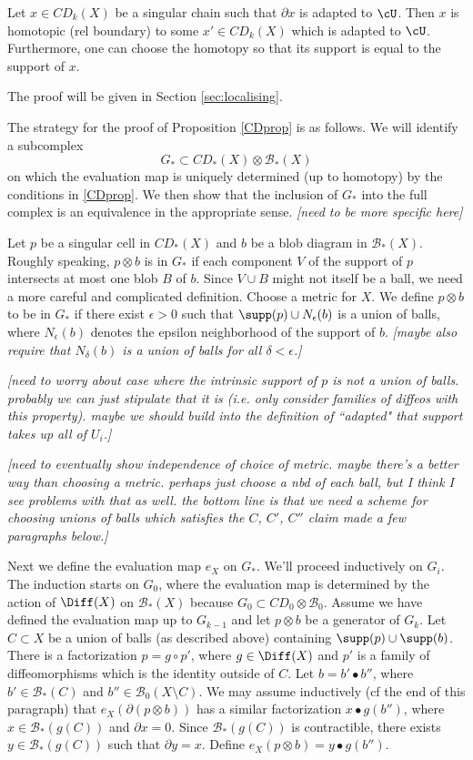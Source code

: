 \documentclass[11pt,leqno]{amsart}
\def\bc{{\mathcal B}}
\def\bd{\partial}
\def\sub{\subset}
\def\setmin{\setminus}
\def\nn#1{{{\it \small [#1]}}}
\begin{document}
\begin{lemma}  \label{extension_lemma}
Let $x \in CD_k(X)$ be a singular chain such that $\bd x$ is adapted to $\cU$.
Then $x$ is homotopic (rel boundary) to some $x' \in CD_k(X)$ which is adapted to $\cU$.
Furthermore, one can choose the homotopy so that its support is equal to the support of $x$.
\end{lemma}

The proof will be given in Section \ref{sec:localising}.

\medskip

The strategy for the proof of Proposition \ref{CDprop} is as follows.
We will identify a subcomplex
\[
    G_* \sub CD_*(X) \otimes \bc_*(X)
\]
on which the evaluation map is uniquely determined (up to homotopy) by the conditions
in \ref{CDprop}.
We then show that the inclusion of $G_*$ into the full complex
is an equivalence in the appropriate sense.
\nn{need to be more specific here}

Let $p$ be a singular cell in $CD_*(X)$ and $b$ be a blob diagram in $\bc_*(X)$.
Roughly speaking, $p\otimes b$ is in $G_*$ if each component $V$ of the support of $p$
intersects at most one blob $B$ of $b$.
Since $V \cup B$ might not itself be a ball, we need a more careful and complicated definition.
Choose a metric for $X$.
We define $p\otimes b$ to be in $G_*$ if there exist $\epsilon > 0$ such that
$\supp(p) \cup N_\epsilon(b)$ is a union of balls, where $N_\epsilon(b)$ denotes the epsilon
neighborhood of the support of $b$.
\nn{maybe also require that $N_\delta(b)$ is a union of balls for all $\delta<\epsilon$.}

\nn{need to worry about case where the intrinsic support of $p$ is not a union of balls.
probably we can just stipulate that it is (i.e. only consider families of diffeos with this property).
maybe we should build into the definition of ``adapted" that support takes up all of $U_i$.}

\nn{need to eventually show independence of choice of metric.  maybe there's a better way than
choosing a metric.  perhaps just choose a nbd of each ball, but I think I see problems
with that as well.
the bottom line is that we need a scheme for choosing unions of balls
which satisfies the $C$, $C'$, $C''$ claim made a few paragraphs below.}

Next we define the evaluation map $e_X$ on $G_*$.
We'll proceed inductively on $G_i$.
The induction starts on $G_0$, where the evaluation map is determined
by the action of $\Diff(X)$ on $\bc_*(X)$
because $G_0 \sub CD_0\otimes \bc_0$.
Assume we have defined the evaluation map up to $G_{k-1}$ and
let $p\otimes b$ be a generator of $G_k$.
Let $C \sub X$ be a union of balls (as described above) containing $\supp(p)\cup\supp(b)$.
There is a factorization $p = g \circ p'$, where $g\in \Diff(X)$ and $p'$ is a family of diffeomorphisms which is the identity outside of $C$.
Let $b = b'\bullet b''$, where $b' \in \bc_*(C)$ and $b'' \in \bc_0(X\setmin C)$.
We may assume inductively 
(cf the end of this paragraph)
that $e_X(\bd(p\otimes b))$ has a similar factorization $x\bullet g(b'')$, where
$x \in \bc_*(g(C))$ and $\bd x = 0$.
Since $\bc_*(g(C))$ is contractible, there exists $y \in \bc_*(g(C))$ such that $\bd y = x$.
Define $e_X(p\otimes b) = y\bullet g(b'')$.
\end{document}
